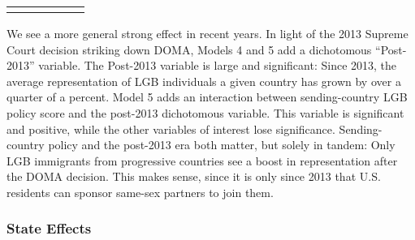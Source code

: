 \documentclass[
  12pt,
]{article}
\begin{document}
\begin{table}[ht]
\begin{centerbox}
\begin{threeparttable}
\begin{tabularx}{1\textwidth}{p{} p{} p{} p{} p{} p{}}
\hhline{}
\arrayrulecolor{black}
\end{tabularx}
\end{threeparttable}\par\end{centerbox}

\end{table}
 

We see a more general strong effect in recent years. In light of the 2013 Supreme Court decision striking down DOMA, Models 4 and 5 add a dichotomous ``Post-2013'' variable. The Post-2013 variable is large and significant: Since 2013, the average representation of LGB individuals a given country has grown by over a quarter of a percent. Model 5 adds an interaction between sending-country LGB policy score and the post-2013 dichotomous variable. This variable is significant and positive, while the other variables of interest lose significance. Sending-country policy and the post-2013 era both matter, but solely in tandem: Only LGB immigrants from progressive countries see a boost in representation after the DOMA decision. This makes sense, since it is only since 2013 that U.S. residents can sponsor same-sex partners to join them.

\hypertarget{state-effects}{%
\subsubsection{State Effects}\label{state-effects}}

 
  \providecommand{\huxb}[2]{\arrayrulecolor[RGB]{#1}\global\arrayrulewidth=#2pt}
  \providecommand{\huxvb}[2]{\color[RGB]{#1}\vrule width #2pt}
  \providecommand{\huxtpad}[1]{\rule{0pt}{#1}}
  \providecommand{\huxbpad}[1]{\rule[-#1]{0pt}{#1}}
\end{document}
